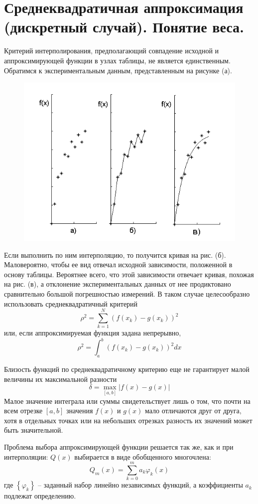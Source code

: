 \section{Среднеквадратичная аппроксимация (дискретный случай). Понятие веса.}\label{sec:ch13}
Критерий интерполирования, предполагающий совпадение исходной и аппроксимирующей
функции в узлах таблицы, не является единственным. Обратимся к экспериментальным
данным, представленным на рисунке (а).
\begin{figure}[H]
    \centering
    \includegraphics[width=0.5\linewidth]{subfiles/images/13_1.png}
    \label{fig:13_1}
\end{figure}
Если выполнить по ним интерполяцию, то получится кривая на рис. (б). Маловероятно,
чтобы ее вид отвечал исходной зависимости, положенной в основу таблицы. Вероятнее
всего, что этой зависимости отвечает кривая, похожая на рис. (в), а отклонение
экспериментальных данных от нее продиктовано сравнительно большой погрешностью
измерений. В таком случае целесообразно использовать среднеквадратичный критерий
\begin{equation*}
    \rho^2 = \sum_{k=1}^{N} \left( f(x_k) - g(x_k) \right)^2
\end{equation*}
или, если аппроксимируемая функция задана непрерывно,
\begin{equation*}
    \rho^2 = \int_a^b \left( f(x_k) - g(x_k) \right)^2 dx
\end{equation*}

Близость функций по среднеквадратичному критерию еще не гарантирует малой
величины их максимальной разности
\begin{equation*}
    \delta = \max_{[a, b]} \left| f(x) - g(x) \right|
\end{equation*}
Малое значение интеграла или суммы свидетельствует лишь о том, что почти на всем
отрезке $[a, b]$ значения $f(x)$ и $g(x)$ мало отличаются друг от друга, хотя в
отдельных точках или на небольших отрезках разность их значений может быть
значительной.

Проблема выбора аппроксимирующей функции решается так же, как и при интерполяции:
$Q(x)$ выбирается в виде обобщенного многочлена:
\begin{equation}
    Q_m(x) = \sum_{k=0}^{m} a_k \varphi_k (x) \label{eq:com_polynom}
\end{equation}
где $\left\{ \varphi_k \right\}$ -- заданный набор линейно независимых функций,
а коэффициенты $a_k$ подлежат определению.

